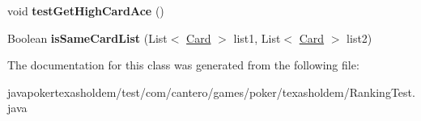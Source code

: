 \begin{DoxyCompactItemize}
\item 
\hypertarget{classcom_1_1cantero_1_1games_1_1poker_1_1texasholdem_1_1_ranking_test_a15b41a52f2ffed59276190b7298961b1}{}void {\bfseries test\+Get\+High\+Card\+Ace} ()\label{classcom_1_1cantero_1_1games_1_1poker_1_1texasholdem_1_1_ranking_test_a15b41a52f2ffed59276190b7298961b1}

\item 
\hypertarget{classcom_1_1cantero_1_1games_1_1poker_1_1texasholdem_1_1_ranking_test_ab8a71455ef1592c4eb4121f335fce462}{}Boolean {\bfseries is\+Same\+Card\+List} (List$<$ \hyperlink{classcom_1_1cantero_1_1games_1_1poker_1_1texasholdem_1_1_card}{Card} $>$ list1, List$<$ \hyperlink{classcom_1_1cantero_1_1games_1_1poker_1_1texasholdem_1_1_card}{Card} $>$ list2)\label{classcom_1_1cantero_1_1games_1_1poker_1_1texasholdem_1_1_ranking_test_ab8a71455ef1592c4eb4121f335fce462}

\end{DoxyCompactItemize}


The documentation for this class was generated from the following file\+:\begin{DoxyCompactItemize}
\item 
javapokertexasholdem/test/com/cantero/games/poker/texasholdem/Ranking\+Test.\+java\end{DoxyCompactItemize}
